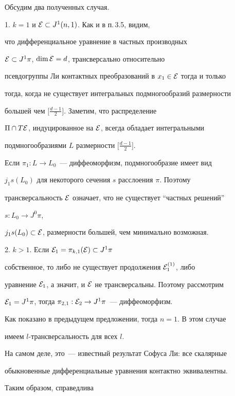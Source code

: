 Обсудим два полученных случая.





1. $k=1$ и ${\cal E}\subset J^1(n,1)$. Как и в п.\,3.5, видим,


что дифференциальное уравнение в частных производных


${\cal E}\subset J^1\pi$, $\dim{\cal E}=d$, трансверсально относительно


псевдогруппы Ли контактных преобразований в $x_1\in{\cal E}$ тогда и только


тогда, когда не существует интегральных подмногообразий размерности


большей чем $\big[\frac{d-1}2\big]$. Заметим, что распределение


$\Pi\cap T{\cal E}$, индуцированное на ${\cal E}$, всегда обладает интегральными


подмногообразиями $L$ размерности $\big[\frac{d-1}2\big]$.


Если $\pi_1:L\to L_0$~--- диффеоморфизм, подмногообразие имеет вид


$j_1s(L_0)$ для некоторого сечения $s$ расслоения $\pi$. Поэтому


трансверсальность ${\cal E}$ означает, что не существует ``частных решений''


$s:L_0\to J^0\pi$,


$j_1s(L_0)\subset{\cal E}$, размерности большей, чем минимально возможная.





2. $k>1$. Если ${\cal E}_1=\pi_{k,1}({\cal E})\subset J^1\pi$


собственное, то либо не существует продолжения ${\cal E}_1^{(1)}$, либо


уравнение ${\cal E}_1$, а значит, и ${\cal E}$ не трансверсальны. Поэтому рассмотрим


${\cal E}_1=J^1\pi$, тогда $\pi_{2,1}:{\cal E}_2\to J^1\pi$~--- диффеоморфизм.


Как показано в предыдущем предложении, тогда $n=1$. В этом случае


имеем $l$-трансверсальность для всех $l$.





На самом деле, это~--- известный результат Софуса Ли: все скалярные


обыкновенные дифференциальные уравнения контактно эквивалентны.





Таким образом, справедлива





